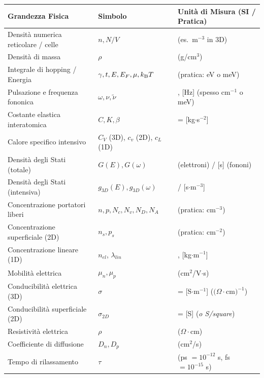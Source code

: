 \begin{table}[htpb]
\centering
\renewcommand{\arraystretch}{1.3}
{\small
\begin{tabular}{>{\raggedright\arraybackslash}p{5.5cm} >{\raggedright\arraybackslash}p{4.2cm} >{\raggedright\arraybackslash}p{6.5cm}}
\toprule
\textbf{Grandezza Fisica} & \textbf{Simbolo} & \textbf{Unità di Misura (SI / Pratica)} \\
\midrule
Densità numerica reticolare / celle & $n, N/V$ & [m$^{-d}$] \quad (es.\ m$^{-3}$ in 3D) \\
Densità di massa & $\rho$ & [kg$\cdot$m$^{-3}$] \quad (g/cm$^3$) \\
Integrale di hopping / Energia & $\gamma, t, E, E_F, \mu, k_{\mathrm{B}} T$ & [J] \quad (pratica: eV o meV) \\
Pulsazione e frequenza fononica & $\omega, \nu, \tilde\nu$ & [rad$\cdot$s$^{-1}$], [Hz] \quad (spesso cm$^{-1}$ o meV) \\
Costante elastica interatomica & $C, K, \beta$ & [N$\cdot$m$^{-1}$] = [kg$\cdot$s$^{-2}$] \\
Calore specifico intensivo & $C_V$ (3D), $c_v$ (2D), $c_L$ (1D) & [J$\cdot$K$^{-1}\cdot$m$^{-d}$] \\
Densità degli Stati (totale) & $G(E), G(\omega)$ & [J$^{-1}$] (elettroni) / [s] (fononi) \\
Densità degli Stati (intensiva) & $g_{3D}(E), g_{3D}(\omega)$ & [J$^{-1}\cdot$m$^{-3}$] / [s$\cdot$m$^{-3}$] \\
Concentrazione portatori liberi & $n, p, N_c, N_v, N_D, N_A$ & [m$^{-3}$] \quad (pratica: cm$^{-3}$) \\
Concentrazione superficiale (2D) & $n_s, p_s$ & [m$^{-2}$] \quad (pratica: cm$^{-2}$) \\
Concentrazione lineare (1D) & $n_{el}$, $\lambda_{lin}$ & [m$^{-1}$], [kg$\cdot$m$^{-1}$] \\
Mobilità elettrica & $\mu_n, \mu_p$ & [m$^2\cdot$V$^{-1}\cdot$s$^{-1}$] \quad (cm$^2$/V$\cdot$s) \\
Conducibilità elettrica (3D) & $\sigma$ & [$\Omega^{-1}\cdot$m$^{-1}$] = [S$\cdot$m$^{-1}$] \quad ($(\Omega\cdot$cm$)^{-1}$) \\
Conducibilità superficiale (2D) & $\sigma_{2D}$ & [$\Omega^{-1}$] = [S] \quad (\textit{o S/square}) \\
Resistività elettrica & $\rho$ & [$\Omega\cdot$m] \quad ($\Omega\cdot$cm) \\
Coefficiente di diffusione & $D_n, D_p$ & [m$^2\cdot$s$^{-1}$] \quad (cm$^2$/s) \\
Tempo di rilassamento & $\tau$ & [s] \quad (ps $=10^{-12}$ s, fs $=10^{-15}$ s) \\
\bottomrule
\end{tabular}}
\end{table}

